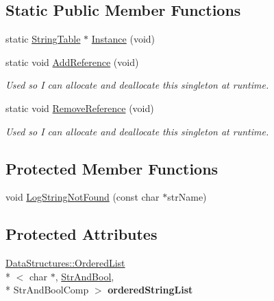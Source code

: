 \subsection*{Static Public Member Functions}
\begin{DoxyCompactItemize}
\item 
static \hyperlink{class_rak_net_1_1_string_table}{String\-Table} $\ast$ \hyperlink{class_rak_net_1_1_string_table_a617d718082882aff164a1b7438dcaf02}{Instance} (void)
\item 
\hypertarget{class_rak_net_1_1_string_table_a97a4694667352c36c51482bc5eaa65cc}{static void \hyperlink{class_rak_net_1_1_string_table_a97a4694667352c36c51482bc5eaa65cc}{Add\-Reference} (void)}\label{class_rak_net_1_1_string_table_a97a4694667352c36c51482bc5eaa65cc}

\begin{DoxyCompactList}\small\item\em Used so I can allocate and deallocate this singleton at runtime. \end{DoxyCompactList}\item 
\hypertarget{class_rak_net_1_1_string_table_a9e4ff943574ceb7c3a545725a428e0e7}{static void \hyperlink{class_rak_net_1_1_string_table_a9e4ff943574ceb7c3a545725a428e0e7}{Remove\-Reference} (void)}\label{class_rak_net_1_1_string_table_a9e4ff943574ceb7c3a545725a428e0e7}

\begin{DoxyCompactList}\small\item\em Used so I can allocate and deallocate this singleton at runtime. \end{DoxyCompactList}\end{DoxyCompactItemize}
\subsection*{Protected Member Functions}
\begin{DoxyCompactItemize}
\item 
void \hyperlink{class_rak_net_1_1_string_table_af5e8803a9ced2dfe6f9dceba6e1d9742}{Log\-String\-Not\-Found} (const char $\ast$str\-Name)
\end{DoxyCompactItemize}
\subsection*{Protected Attributes}
\begin{DoxyCompactItemize}
\item 
\hypertarget{class_rak_net_1_1_string_table_a7e11d0dac6df380aa1217fe2bf84552d}{\hyperlink{class_data_structures_1_1_ordered_list}{Data\-Structures\-::\-Ordered\-List}\\*
$<$ char $\ast$, \hyperlink{struct_str_and_bool}{Str\-And\-Bool}, \\*
Str\-And\-Bool\-Comp $>$ {\bfseries ordered\-String\-List}}\label{class_rak_net_1_1_string_table_a7e11d0dac6df380aa1217fe2bf84552d}

\end{DoxyCompactItemize}
